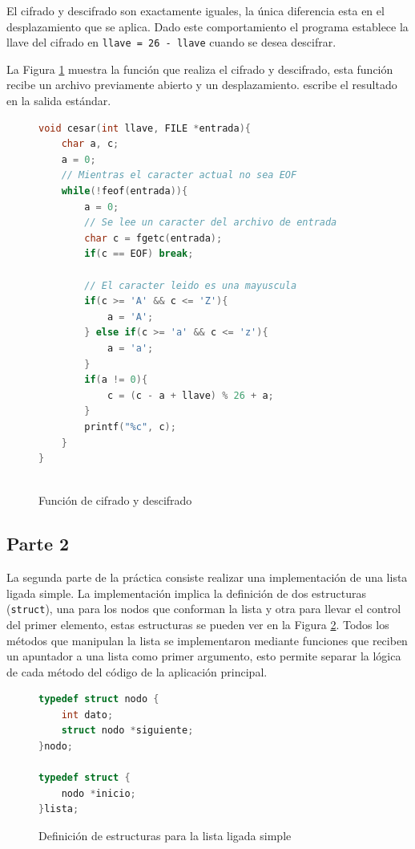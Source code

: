 \documentclass {article}
\begin{document}
El cifrado y descifrado son exactamente iguales, la única 
diferencia esta en el desplazamiento que se aplica. Dado este 
comportamiento el programa establece la llave del cifrado en 
\texttt{llave = 26 - llave} cuando se desea descifrar.

La Figura \ref{fig:cifrado} muestra la función que realiza el
cifrado y descifrado, esta función recibe un archivo previamente
abierto y un desplazamiento. escribe el resultado en la salida 
estándar.

\begin{figure}[htbp]
    \centering
    \begin{lstlisting}[language=C]
void cesar(int llave, FILE *entrada){
    char a, c;
    a = 0;
    // Mientras el caracter actual no sea EOF 
    while(!feof(entrada)){
        a = 0;
        // Se lee un caracter del archivo de entrada
        char c = fgetc(entrada);
        if(c == EOF) break; 

        // El caracter leido es una mayuscula
        if(c >= 'A' && c <= 'Z'){
            a = 'A';
        } else if(c >= 'a' && c <= 'z'){
            a = 'a';
        }
        if(a != 0){
            c = (c - a + llave) % 26 + a;
        }
        printf("%c", c);
    }
}
        
    \end{lstlisting}
    \caption{Función de cifrado y descifrado}
    \label{fig:cifrado}
\end{figure}

\subsection{Parte 2}
La segunda parte de la práctica consiste realizar una 
implementación de una lista ligada simple. La implementación 
implica la definición de dos estructuras (\texttt{struct}), 
una para los nodos que conforman la lista y otra para llevar 
el control del primer elemento, estas estructuras se pueden 
ver en la Figura \ref{fig:structs}. Todos los métodos que manipulan
la lista se implementaron mediante funciones que reciben un 
apuntador a una lista como primer argumento, esto permite separar
la lógica de cada método del código de la aplicación principal.

\begin{figure}
    \centering
    \begin{lstlisting}[language=C]
typedef struct nodo {
    int dato;
    struct nodo *siguiente;
}nodo;

typedef struct {
    nodo *inicio;
}lista;
    \end{lstlisting}
    \caption{Definición de estructuras para la lista ligada simple}
    \label{fig:structs}
\end{figure}
\end{document}

